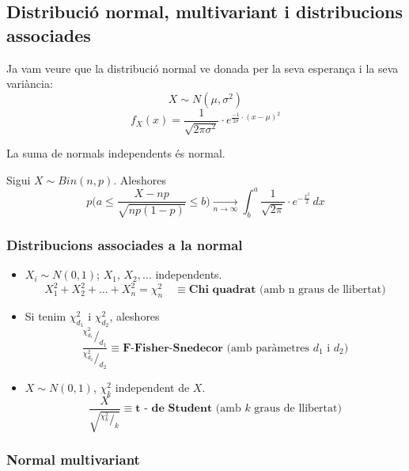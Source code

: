 \subsection{Distribució normal, multivariant i distribucions associades}

Ja vam veure que la distribució normal ve donada per la seva esperança i la seva variància: 
\[
  X \sim N(\mu, \sigma^{2})
\]
\[
  f_{X}(x) = \frac{1}{\sqrt{2\pi\sigma^{2}}}\cdot e^{\frac{-1}{2\sigma}\cdot(x-\mu)^{2}}
\]

La suma de normals independents és normal.

\begin{thm}
  Sigui $X\sim Bin(n,p)$. Aleshores 
  \[
    p\Bigg(a \leq \frac{X-np}{\sqrt{np(1-p)}}\leq b\Bigg)\xrightarrow[n\to\infty]{} \int_{b}^{a} \frac{1}{\sqrt{2\pi}}\cdot e^{-\frac{x^{2}}{2}}\, dx
  \]
\end{thm}

\newpage

\subsubsection{Distribucions associades a la normal}
\begin{itemize}
    \item $X_{i}\sim N(0,1)$; $X_{1}, \, X_{2},\ldots$ independents. 
    \[
      X_{1}^{2}+X_{2}^{2}+\ldots+X_{n}^{2}=\chi_{n}^{2} \quad \equiv \textbf{Chi quadrat} \text{ (amb n graus de llibertat})
    \]
    \item Si tenim $\chi_{d_{1}}^{2}$ i $\chi_{d_{2}}^{2}$, aleshores
    \[
      \frac{^{\chi_{d_{1}}^{2}} / _{d_{1}}}{^{\chi_{d_{2}}^{2}} / _{d_{2}}} \equiv \textbf{F-Fisher-Snedecor} \text{ (amb paràmetres $d_{1}$ i $d_{2}$)}
    \]
    \item $X\sim N(0,1)$, $\chi_{k}^{2}$ independent de $X$.
    \[
      \frac{X}{\sqrt{^{\chi_{k}^{2}} / _k}} \equiv \textbf{t - de Student} \text{ (amb $k$ graus de llibertat)}
    \]
\end{itemize}

\subsubsection{Normal multivariant}

